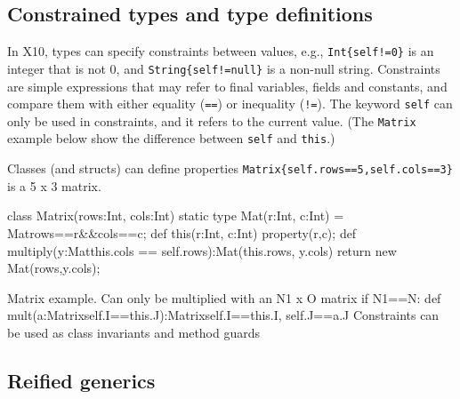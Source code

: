 \documentclass[a4paper]{article}
\def\codesmaller{\small}
\newcommand{\code}[1]{\texttt{\textup{\codesmaller #1}}}
\begin{document}
\subsection{Constrained types and type definitions}
In X10, types can specify constraints between values,
    e.g., \code{Int\{self!=0\}} is an integer that is not 0,
        and \code{String\{self!=null\}} is a non-null string.
Constraints are simple expressions that may refer to final variables, fields and constants,
    and compare them with either equality (\code{==}) or inequality (\code{!=}).
The keyword \code{self} can only be used in constraints, and it refers to the current value.
(The \code{Matrix} example below show the difference between \code{self} and \code{this}.)

Classes (and structs) can define properties
    \code{Matrix\{self.rows==5,self.cols==3\}} is a 5 x 3 matrix.
\begin{xten}
class Matrix(rows:Int, cols:Int) {
  static type Mat(r:Int, c:Int) = Mat{rows==r&&cols==c};
  def this(r:Int, c:Int) {
    property(r,c);
  }
  def multiply(y:Mat{this.cols == self.rows}):Mat(this.rows, y.cols) {
    return new Mat(rows,y.cols);
  }
}
\end{xten}
Matrix example.
Can only be multiplied with an N1 x O matrix if N1==N: def mult(a:Matrix{self.I==this.J}):Matrix{self.I==this.I, self.J==a.J}
Constraints can be used as class invariants and method guards



\subsection{Reified generics}

\end{document}
